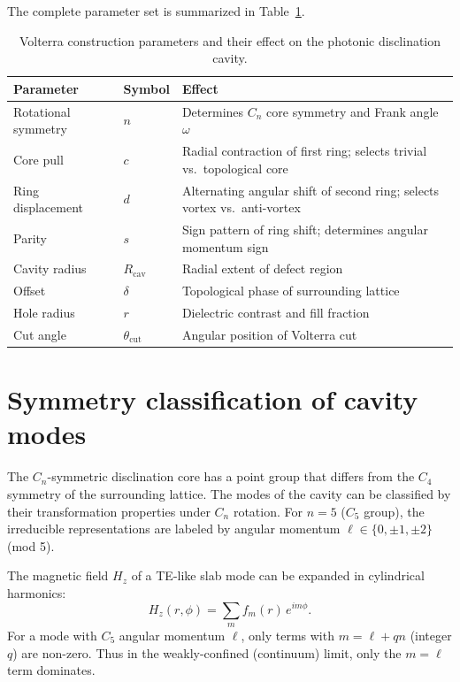 \documentclass[12pt,a4paper,oneside]{book}
\theoremstyle{plain}
\theoremstyle{definition}
\theoremstyle{remark}
\newcommand{\tabref}[1]{Table~\ref{#1}}
\begin{document}
The complete parameter set is summarized in \tabref{tab:volterra-params}.

\begin{table}[htbp]
  \centering
  \caption{Volterra construction parameters and their effect on the photonic disclination cavity.}
  \label{tab:volterra-params}
  \begin{tabular}{llp{7cm}}
    \toprule
    Parameter & Symbol & Effect \\
    \midrule
    Rotational symmetry & $n$ & Determines $C_n$ core symmetry and Frank angle $\omega$ \\
    Core pull & $c$ & Radial contraction of first ring; selects trivial vs.\ topological core \\
    Ring displacement & $d$ & Alternating angular shift of second ring; selects vortex vs.\ anti-vortex \\
    Parity & $s$ & Sign pattern of ring shift; determines angular momentum sign \\
    Cavity radius & $R_\mathrm{cav}$ & Radial extent of defect region \\
    Offset & $\delta$ & Topological phase of surrounding lattice \\
    Hole radius & $r$ & Dielectric contrast and fill fraction \\
    Cut angle & $\theta_\mathrm{cut}$ & Angular position of Volterra cut \\
    \bottomrule
  \end{tabular}
\end{table}

\section{Symmetry classification of cavity modes}
\label{sec:mode-symmetry}

The $C_n$-symmetric disclination core has a point group that differs from the $C_4$ symmetry of the surrounding lattice. The modes of the cavity can be classified by their transformation properties under $C_n$ rotation. For $n=5$ ($C_5$ group), the irreducible representations are labeled by angular momentum $\ell \in \{0, \pm1, \pm2\}$ (mod 5).

The magnetic field $H_z$ of a TE-like slab mode can be expanded in cylindrical harmonics:
\begin{equation}
  H_z(r, \phi) = \sum_m f_m(r)\,e^{im\phi}.
  \label{eq:multipole-Hz}
\end{equation}
For a mode with $C_5$ angular momentum $\ell$, only terms with $m = \ell + qn$ (integer $q$) are non-zero. Thus in the weakly-confined (continuum) limit, only the $m=\ell$ term dominates.
\end{document}
